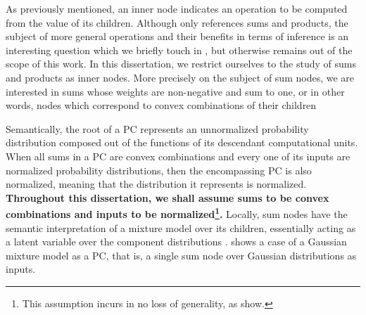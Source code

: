 As previously mentioned, an inner node indicates an operation to be computed from the value of its
children. Although  only references sums and products, the subject of more general
operations and their benefits in terms of inference is an interesting question which we briefly
touch in , but otherwise remains out of the scope of this work. In this
dissertation, we restrict ourselves to the study of sums and products as inner nodes. More
precisely on the subject of sum nodes, we are interested in sums whose weights are non-negative and
sum to one, or in other words, nodes which correspond to convex combinations of their children

Semantically, the root of a PC represents an unnormalized probability distribution composed out of
the functions of its descendant computational units. When all sums in a PC are convex combinations
and every one of its inputs are normalized probability distributions, then the encompassing PC is
also normalized, meaning that the distribution it represents is normalized. \textbf{Throughout this
dissertation, we shall assume sums to be convex combinations and inputs to be
normalized\footnote{This assumption incurs in no loss of generality, as \cite{peharz15} show.}.}
Locally, sum nodes have the semantic interpretation of a mixture model over its children,
essentially acting as a latent variable over the component distributions \citep{poon11,peharz16}.
 shows a case of a Gaussian mixture model as a PC, that is, a single sum node
over Gaussian distributions as inputs.

